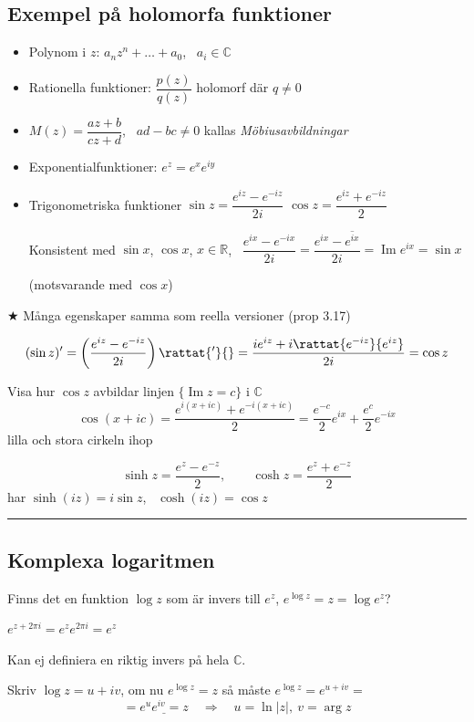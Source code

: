 \subsection{Exempel på holomorfa funktioner}
\begin{itemize}
  \item Polynom i $z$: $a_n z^n + \dots + a_0$, \ $a_i \in \mathbb{C}$
  \item Rationella funktioner: $\dfrac{p(z)}{q(z)}$ holomorf där $q \neq 0$
  \item $M(z) = \dfrac{az + b}{cz + d}$, \ $ad - bc \neq 0$ kallas \emph{Möbiusavbildningar}
  \item Exponentialfunktioner: $e^z = e^x e^{iy}$
  \item Trigonometriska funktioner \quad $\sin z = \dfrac{e^{iz} - e^{-iz}}{2i}$ \quad $\cos z = \dfrac{e^{iz} + e^{-iz}}{2}$

  Konsistent med $\sin x$, $\cos x$, $x \in \mathbb{R}$, \ $\dfrac{e^{ix} - e^{-ix}}{2i} = \dfrac{e^{ix} - \overline{e^{ix}}}{2i} = \operatorname{Im} e^{ix} = \sin x$

  (motsvarande med $\cos x$)
\end{itemize}

\textcolor{magenta!80!black}{$\bigstar$} Många egenskaper samma som reella versioner (prop 3.17)

\begin{example}
\[ (\sin z)' = \left( \frac{e^{iz} - e^{-iz}}{2i} \right)\rattat{'}{} = \frac{ie^{iz} + i\rattat{e^{-iz}}{e^{iz}}}{2i} = \cos z \]
\end{example}

\begin{example}
Visa hur $\cos z$ avbildar linjen $\{\operatorname{Im} z = c\}$ i $\mathbb{C}$
\[ \cos(x + ic) = \frac{e^{i(x + ic)} + e^{-i(x + ic)}}{2} = \frac{e^{-c}}{2} e^{ix} + \frac{e^{c}}{2} e^{-ix} \]
\textcolor{blue!60!black}{lilla och stora cirkeln ihop}
\end{example}

\[ \sinh z = \frac{e^z - e^{-z}}{2}, \qquad \cosh z = \frac{e^z + e^{-z}}{2} \]
har $\sinh(iz) = i\sin z$, \ $\cosh(iz) = \cos z$

\noindent\rule{\linewidth}{0.4pt}

\subsection{Komplexa logaritmen}
Finns det en funktion $\log z$ som är invers till $e^z$, $e^{\log z} = z = \log e^z$?

\begin{note}
$e^{z + 2\pi i} = e^z e^{2\pi i} = e^z$

Kan ej definiera en riktig invers på hela $\mathbb{C}$.
\end{note}

Skriv $\log z = u + iv$, om nu $e^{\log z} = z$ så måste $e^{\log z} = e^{u + iv} =$
\[ = \underline{e^u e^{iv} = z} \quad \Rightarrow \quad u = \ln|z|, \ v = \arg z \]
